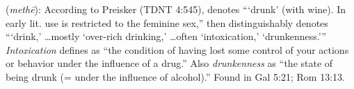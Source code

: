 \item[Drunkenness,]

(\textit{methē}):
According to Preisker (TDNT 4:545),  denotes ```drunk' (with wine). In early lit. use is restricted to the feminine sex,'' then  distinguishably denotes ```drink,' \ldots mostly `over-rich drinking,' \ldots often `intoxication,' `drunkenness.''' \emph{Intoxication} defines as ``the condition of having lost some control of your actions or behavior under the influence of a drug.'' Also \emph{drunkenness}  as ``the state of being drunk (= under the influence of alcohol).''
Found in Gal 5:21; Rom 13:13.
